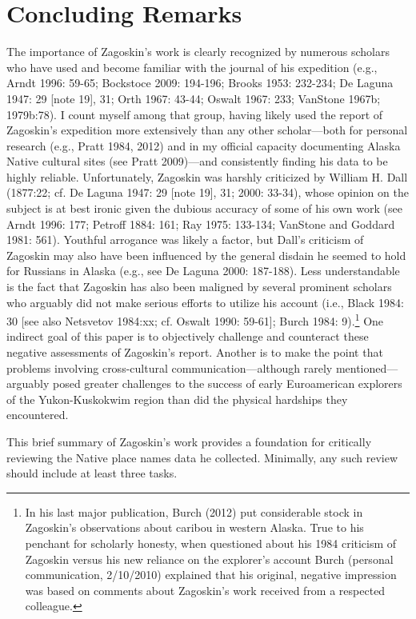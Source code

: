 \section{Concluding Remarks}
The importance of Zagoskin’s work is clearly recognized by numerous scholars who have used and become familiar with the journal of his expedition (e.g., Arndt 1996: 59-65; Bockstoce 2009: 194-196; Brooks 1953: 232-234; De Laguna 1947: 29 [note 19], 31; Orth 1967: 43-44; Oswalt 1967: 233; VanStone 1967b; 1979b:78). I count myself among that group, having likely used the report of Zagoskin’s expedition more extensively than any other scholar—both for personal research (e.g., Pratt 1984, 2012) and in my official capacity documenting Alaska Native cultural sites (see Pratt 2009)—and consistently finding his data to be highly reliable. Unfortunately, Zagoskin was harshly criticized by William H. Dall (1877:22; cf. De Laguna 1947: 29 [note 19], 31; 2000: 33-34), whose opinion on the subject is at best ironic given the dubious accuracy of some of his own work (see Arndt 1996: 177; Petroff 1884: 161; Ray 1975: 133-134; VanStone and Goddard 1981: 561). Youthful arrogance was likely a factor, but Dall’s criticism of Zagoskin may also have been influenced by the general disdain he seemed to hold for Russians in Alaska (e.g., see De Laguna 2000: 187-188). Less understandable is the fact that Zagoskin has also been maligned by several prominent scholars who arguably did not make serious efforts to utilize his account (i.e., Black 1984: 30 [see also Netsvetov 1984:xx; cf. Oswalt 1990: 59-61]; Burch 1984: 9).\footnote{In his last major publication, Burch (2012) put considerable stock in Zagoskin’s observations about caribou in western Alaska. True to his penchant for scholarly honesty, when questioned about his 1984 criticism of Zagoskin versus his new reliance on the explorer’s account Burch (personal communication, 2/10/2010) explained that his original, negative impression was based on comments about Zagoskin’s work received from a respected colleague.} One indirect goal of this paper is to objectively challenge and counteract these negative assessments of Zagoskin’s report. Another is to make the point that problems involving cross-cultural communication—although rarely mentioned—arguably posed greater challenges to the success of early Euroamerican explorers of the Yukon-Kuskokwim region than did the physical hardships they encountered.

This brief summary of Zagoskin’s work provides a foundation for critically reviewing the Native place names data he collected. Minimally, any such review should include at least three tasks.

